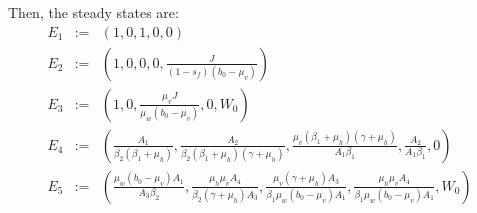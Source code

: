 \documentclass[12pt,leqno]{article}
\newtheorem{Proposition}[Theorem]{Proposition}%
\begin{document}
Then, the steady states are:
\begin{eqnarray*}
E_1 &:=& (1,0,1,0,0)\\
E_2 &:=& \left(1,0,0,0,\frac{J}{(1-s_f)(b_0-\mu_v)}\right)\\
E_3 &:=& \left(1,0,\frac{\mu_v J}{\mu_w(b_0-\mu_v)},0,W_0\right)\\
E_4 &:=& \left(\frac{A_1}{\beta_2(\beta_1+\mu_h)},\frac{A_2}{\beta_2(\beta_1+\mu_h)(\gamma+\mu_h)},
\frac{\mu_v(\beta_1+\mu_h)(\gamma+\mu_h)}{A_1\beta_1},\frac{A_2}{A_1\beta_1},0\right)\\
E_5 &:=& \left(\frac{\mu_w(b_0-\mu_v)A_1}{A_3\beta_2},\frac{\mu_h\mu_vA_4}{\beta_2(\gamma+\mu_h)A_3},\frac{\mu_v(\gamma+\mu_h)A_3}{\beta_1\mu_w(b_0-\mu_v)A_1},\frac{\mu_h\mu_vA_4}{\beta_1\mu_w(b_0-\mu_v)A_1},W_0\right)\\
\end{eqnarray*}

\end{document}
